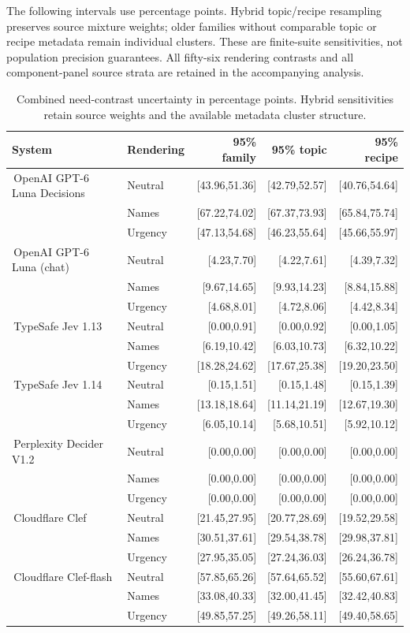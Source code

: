\documentclass[conference]{IEEEtran}
\newcommand{\modelname}[2]{\textcolor{#1}{\textbullet}\,\textnormal{#2}}
\begin{document}
The following intervals use percentage points. Hybrid topic/recipe resampling
preserves source mixture weights; older families without comparable topic or
recipe metadata remain individual clusters. These are finite-suite sensitivities,
not population precision guarantees. All fifty-six rendering contrasts and all
component-panel source strata are retained in the accompanying analysis.

\begin{table}[t]
\caption{Combined need-contrast uncertainty in percentage points. Hybrid sensitivities retain source weights and the available metadata cluster structure.}
\label{tab:combined-uncertainty}
\centering
\small
\setlength{\tabcolsep}{5pt}
\renewcommand{\arraystretch}{1.15}
\begin{tabular}{@{}llrrr@{}}
\toprule
System&Rendering&95\% family&95\% topic&95\% recipe\\
\midrule
\modelname{modelLunaDecisions}{OpenAI GPT-6 Luna Decisions}&Neutral&[43.96,51.36]&[42.79,52.57]&[40.76,54.64]\\
&Names&[67.22,74.02]&[67.37,73.93]&[65.84,75.74]\\
&Urgency&[47.13,54.68]&[46.23,55.64]&[45.66,55.97]\\
\modelname{modelLunaChat}{OpenAI GPT-6 Luna (chat)}&Neutral&[4.23,7.70]&[4.22,7.61]&[4.39,7.32]\\
&Names&[9.67,14.65]&[9.93,14.23]&[8.84,15.88]\\
&Urgency&[4.68,8.01]&[4.72,8.06]&[4.42,8.34]\\
\modelname{modelJev}{TypeSafe Jev 1.13}&Neutral&[0.00,0.91]&[0.00,0.92]&[0.00,1.05]\\
&Names&[6.19,10.42]&[6.03,10.73]&[6.32,10.22]\\
&Urgency&[18.28,24.62]&[17.67,25.38]&[19.20,23.50]\\
\modelname{modelJev114}{TypeSafe Jev 1.14}&Neutral&[0.15,1.51]&[0.15,1.48]&[0.15,1.39]\\
&Names&[13.18,18.64]&[11.14,21.19]&[12.67,19.30]\\
&Urgency&[6.05,10.14]&[5.68,10.51]&[5.92,10.12]\\
\modelname{modelDecider}{Perplexity Decider V1.2}&Neutral&[0.00,0.00]&[0.00,0.00]&[0.00,0.00]\\
&Names&[0.00,0.00]&[0.00,0.00]&[0.00,0.00]\\
&Urgency&[0.00,0.00]&[0.00,0.00]&[0.00,0.00]\\
\modelname{modelClef}{Cloudflare Clef}&Neutral&[21.45,27.95]&[20.77,28.69]&[19.52,29.58]\\
&Names&[30.51,37.61]&[29.54,38.78]&[29.98,37.81]\\
&Urgency&[27.95,35.05]&[27.24,36.03]&[26.24,36.78]\\
\modelname{modelClefFlash}{Cloudflare Clef-flash}&Neutral&[57.85,65.26]&[57.64,65.52]&[55.60,67.61]\\
&Names&[33.08,40.33]&[32.00,41.45]&[32.42,40.83]\\
&Urgency&[49.85,57.25]&[49.26,58.11]&[49.40,58.65]\\
\bottomrule
\end{tabular}
\end{table}
\end{document}
